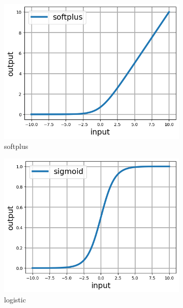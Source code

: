 \documentclass[12pt]{article}
\begin{document}
%
\begin{figure}[h]
  \centering
  \begin{subfigure}[c]{0.45\linewidth}
    \includegraphics[totalheight=4cm]{Figures/scripts/softplus.png}
    \caption{softplus}
  \end{subfigure}
  \begin{subfigure}[c]{0.45\linewidth}
    \includegraphics[totalheight=4cm]{Figures/scripts/logistic.png}
    \caption{logistic}
  \end{subfigure}
  \begin{subfigure}[c]{0.45\linewidth}

\end{subfigure}
\end{figure}
\end{document}
